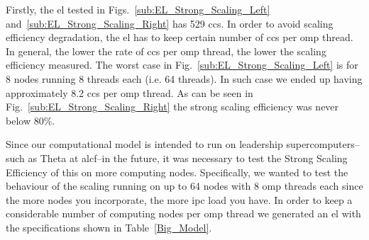 {Firstly, the \gls{el} tested in Figs.~\ref{sub:EL_Strong_Scaling_Left} and~\ref{sub:EL_Strong_Scaling_Right} has 529 \glspl{cc}. In order to avoid scaling efficiency degradation, the \gls{el} has to keep certain number of \glspl{cc} per \gls{omp} thread. In general, the lower the rate of \glspl{cc} per \gls{omp} thread, the lower the scaling efficiency measured. The worst case in Fig.~\ref{sub:EL_Strong_Scaling_Left} is for 8 nodes running 8 threads each (i.e. 64 threads). In such case we ended up having approximately 8.2 \glspl{cc} per \gls{omp} thread. As can be seen in Fig.~\ref{sub:EL_Strong_Scaling_Right} the strong scaling efficiency was never below 80\%. 

Since our computational model is intended to run on leadership supercomputers--such as Theta at \gls{alcf}--in the future, it was necessary to test the Strong Scaling Efficiency of this on more computing nodes. Specifically, we wanted to test the behaviour of the scaling running on up to 64 nodes with 8 \gls{omp} threads each since the more nodes you incorporate, the more \gls{ipc} load you have. In order to keep a considerable number of computing nodes per \gls{omp} thread we generated an \gls{el} with the specifications shown in Table~\ref{Big_Model}. 

}
